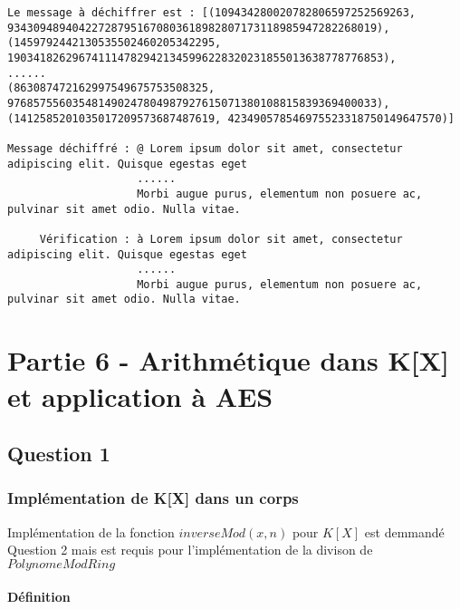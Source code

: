 \documentclass{report}
\newenvironment{code}%
   {\snugshade}%
   {\endsnugshade}
\begin{document}
   \begin{code}\begin{Verbatim}[commandchars=\\\{\}]
Le message à déchiffrer est : [(109434280020782806597252569263,
934309489404227287951670803618982807173118985947282268019), 
(1459792442130535502460205342295, 1903418262967411147829421345996228320231855013638778776853),
......
(863087472162997549675753508325, 976857556035481490247804987927615071380108815839369400033),
(1412585201035017209573687487619, 423490578546975523318750149647570)]

Message déchiffré : @ Lorem ipsum dolor sit amet, consectetur adipiscing elit. Quisque egestas eget
                    ......
                    Morbi augue purus, elementum non posuere ac, pulvinar sit amet odio. Nulla vitae.

     Vérification : à Lorem ipsum dolor sit amet, consectetur adipiscing elit. Quisque egestas eget
                    ......
                    Morbi augue purus, elementum non posuere ac, pulvinar sit amet odio. Nulla vitae.

    \end{Verbatim}
\end{code}

\chapter{\texorpdfstring{\textbf{Partie 6 - Arithmétique dans K{[}X{]}
et application à
AES}}{Partie 6 - Arithmétique dans K{[}X{]} et application à AES}}\label{partie-6---arithmuxe9tique-dans-kx-et-application-uxe0-aes}

\section{\texorpdfstring{\textbf{Question
1}}{Question 1}}\label{question-1}

\subsection{\texorpdfstring{\textbf{Implémentation de K{[}X{]} dans un
corps}}{Implémentation de K{[}X{]} dans un corps}}\label{impluxe9mentation-de-kx-dans-un-corps}

Implémentation de la fonction \(inverseMod(x, n)\) pour \(K[X]\) est
demmandé Question 2 mais est requis pour l'implémentation de la divison
de \(PolynomeModRing\)

\subsubsection{\texorpdfstring{\textbf{Définition}}{Définition}}\label{duxe9finition}
\end{document}
